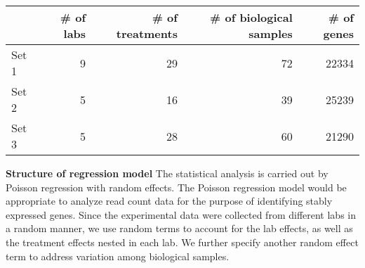 \documentclass[11pt, a4paper]{article}
\begin{document}
\begin{table}[h]
\centering
\begin{tabular}{lrrrr} \hline
& \# of labs & \# of treatments  & \# of biological samples & \# of genes \\ \hline
Set 1 &9 & 29 &72  &22334  \\
Set 2 &5 & 16 & 39 &25239  \\
Set 3 &5 &28  &60  & 21290\\ \hline
\end{tabular}
\end{table}


\textbf{Structure of regression model} The statistical analysis is carried out by Poisson regression with random effects.  The Poisson regression model would be appropriate to analyze read count data for the purpose of identifying stably expressed genes. Since the experimental data were collected from different labs in a random manner, we use random terms to account for the lab effects, as well as the treatment effects nested in each lab. We further specify another random effect term to address variation among biological samples. 
\end{document}
